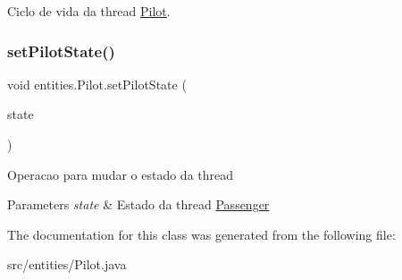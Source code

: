 Ciclo de vida da thread \hyperlink{classentities_1_1_pilot}{Pilot}. \mbox{\label{classentities_1_1_pilot_a1eb8f6f3fd60fbf50829491b6e263ab9}} 
\subsubsection{\texorpdfstring{set\+Pilot\+State()}{setPilotState()}}
{\footnotesize\ttfamily void entities.\+Pilot.\+set\+Pilot\+State (\begin{DoxyParamCaption}\item[{\hyperlink{enumentities_1_1_pilot_enum}{Pilot\+Enum}}]{state }\end{DoxyParamCaption})\hspace{0.3cm}{\ttfamily [inline]}}

Operacao para mudar o estado da thread 
\begin{DoxyParams}{Parameters}
{\em state} & Estado da thread \hyperlink{classentities_1_1_passenger}{Passenger} \\
\hline
\end{DoxyParams}


The documentation for this class was generated from the following file\+:\begin{DoxyCompactItemize}
\item 
src/entities/Pilot.\+java\end{DoxyCompactItemize}

